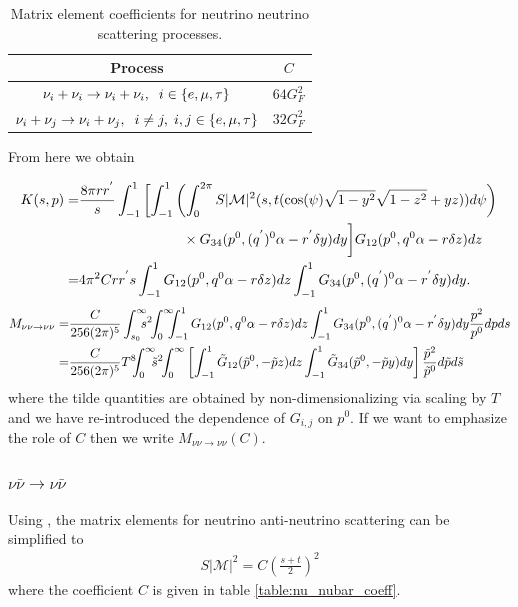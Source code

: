 \begin{table}[ht]
\centering 
\begin{tabular}{|c|c|}
\hline
Process &$C$ \\
\hline
$\nu_i+\nu_i\rightarrow\nu_i+\nu_i,\hspace{2mm} i\in\{e,\mu,\tau\}$& $64 G_F^2$\\
\hline
$\nu_i+\nu_j\rightarrow\nu_i+\nu_j,\hspace{2mm} i\neq j, \hspace{1mm} i,j\in\{e,\mu,\tau\}$& $32 G_F^2$\\
\hline
\end{tabular}
\caption{Matrix element coefficients for neutrino neutrino scattering processes.}
\label{table:nu_nu_coeff}
\end{table}
From here we obtain

\begin{align}
K(s,p)=&\frac{8\pi rr^{'}}{s}\int_{-1}^1 \left[\int_{-1}^1\left(\int_0^{2\pi}S|\mathcal{M}|^2 (s,t(\cos(\psi)\sqrt{1-y^2}\sqrt{1-z^2}+yz))d\psi\right)\right.\notag\\
&\hspace{26mm}\times G_{34}(p^0,(q^{'})^0\alpha-r^{'}\delta y) dy\bigg] G_{12}(p^0,q^0\alpha-r\delta z)dz\notag\\
=& 4\pi^2 Crr^{'}s \int_{-1}^1 G_{12}(p^0,q^0\alpha-r\delta z)dz \int_{-1}^1G_{34}(p^0,(q^{'})^0\alpha-r^{'}\delta y) dy.
\end{align}
{\small
\begin{align}
M_{\nu\nu\rightarrow\nu\nu}=&\frac{C}{256(2\pi)^5 }\int_{s_0}^\infty \!\!\!\!s^2\!\!\int_0^\infty\!\!\!\!\int_{-1}^1 G_{12}(p^0,q^0\alpha-r\delta z)dz \int_{-1}^1G_{34}(p^0,(q^{'})^0\alpha-r^{'}\delta y) dy\frac{ p^2}{p^0}dpds\notag\\
=&\frac{C}{256(2\pi)^5 } T^8\!\!\!\int_{0}^\infty\!\!\!\tilde{s}^2\!\!\int_0^\infty  \left[\int_{-1}^1 \tilde{G}_{12}(\tilde p^0,-\tilde{p} z)dz \int_{-1}^1\tilde{G}_{34}(\tilde p^0,-\tilde{p} y) dy\right]\frac{\tilde{p}^2}{\tilde{p}^0}d\tilde{p}d\tilde{s}
\end{align}
}
where the tilde quantities are obtained by non-dimensionalizing via scaling by $T$ and we have re-introduced the dependence of $G_{i,j}$ on $p^0$. If we want to emphasize the role of $C$ then we write $M_{\nu\nu\rightarrow\nu\nu}(C)$.




\subsubsection{$\nu\bar\nu\rightarrow \nu\bar\nu$ }
Using , the matrix elements for neutrino anti-neutrino scattering can be simplified to
\begin{align}
S|\mathcal{M}|^2=C\left(\frac{s+t}{2}\right)^2
\end{align}
where the coefficient $C$ is given in table \ref{table:nu_nubar_coeff}.


